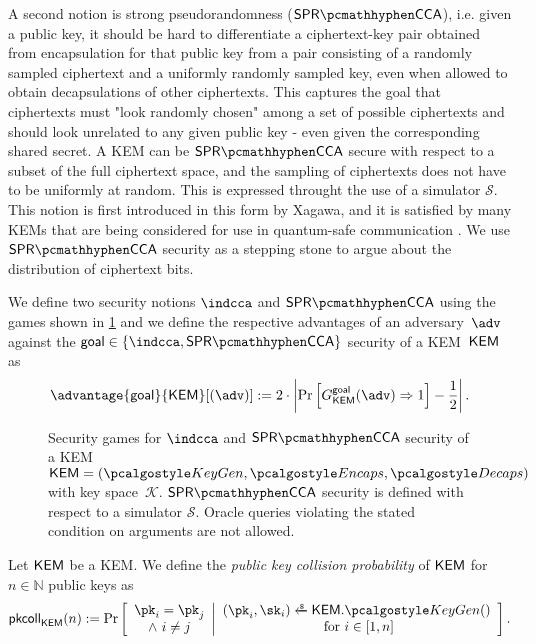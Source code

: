 A second notion is strong pseudorandomness ($\sprcca$), i.e. given a public key, it should be hard to differentiate a ciphertext-key pair obtained from encapsulation for that public key from a pair consisting of a randomly sampled ciphertext and a uniformly randomly sampled key, even when allowed to obtain decapsulations of other ciphertexts.
This captures the goal that ciphertexts must "look randomly chosen" among a set of possible ciphertexts and should look unrelated to any given public key - even given the corresponding shared secret. A KEM can be $\sprcca$ secure with respect to a subset of the full ciphertext space, and the sampling of ciphertexts does not have to be uniformly at random. This is expressed throught the use of a simulator $\mathcal S$.
This notion is first introduced \cite{EC:Xagawa22} in this form by Xagawa, and it is satisfied by many KEMs that are being considered for use in quantum-safe communication \cite{EC:Xagawa22}. We use $\sprcca$ security as a stepping stone to argue about the distribution of ciphertext bits.

\begin{definition} \label{def:kem-security}
    We define two security notions $\indcca$ and $\sprcca$ using the games shown in \cref{fig:kem-security} and we define the respective advantages of an adversary~$\adv$ against the $\mathsf{goal} \in \{\indcca, \sprcca\}$ security of a KEM~$\mathsf{KEM}$ as
\[
    \advantage{\mathsf{goal}}{\KEM}[(\adv)] := 2 \cdot \left| \Pr \left[ G^{\mathsf{goal}}_{\KEM}(\adv) \Rightarrow 1 \right] - \frac{1}{2} \right|.
\]
\end{definition}

\begin{figure}
    
    \caption[%
        Security games for $\indcca$ and $\sprcca$ security of a KEM or obfuscated KEM.
    ]{%
        Security games for $\indcca$ and $\sprcca$ security of a KEM~$\KEM = (\kgen, \encaps, \decaps)$ with key space~$\mathcal K$. $\sprcca$ security is defined with respect to a simulator $\mathcal S$. Oracle queries violating the stated condition on arguments are not allowed.
    }
    \label{fig:kem-security}
\end{figure}

\begin{definition}
    \label{def:pk-collisions}
    Let $\mathsf{KEM}$ be a KEM.
    We define the \emph{public key collision probability} of $\mathsf{KEM}$ for $n \in \mathbb{N}$ public keys as
    \[
        \pkcoll{\KEM}(n) := \Pr\left[
            \begin{array}{c}
                \pk_i = \pk_j \\
                \land~ i \neq j
            \end{array}
            \middle|
            \begin{array}{c}
                (\pk_i,\sk_i) \getsr \KEM.\kgen() \\
                \text{ for } i \in [1,n]
            \end{array}
            \right].
    \]
\end{definition}

